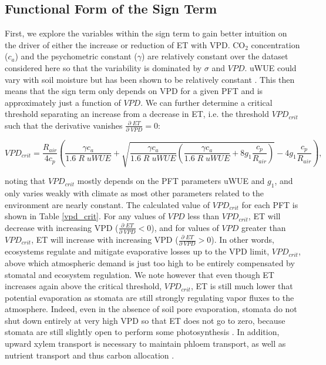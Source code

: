 \documentclass[draft,linenumbers]{agujournal}
\begin{document}
\subsection{Functional Form of the Sign Term}
\label{sign_term}
First, we explore the variables within the sign term to gain better intuition on the driver of either the increase or reduction of ET with VPD. CO$_2$ concentration ($c_a$) and the psychometric constant ($\gamma$) are relatively constant over the dataset considered here so that the variability is dominated by $\sigma$ and $VPD$. uWUE could vary with soil moisture but has been shown to be relatively constant \citep{Zhou_2015}. This then means that the sign term only depends on VPD for a given PFT and is approximately just a function of $VPD$. We can further determine a critical threshold separating an increase from a decrease in ET, i.e. the threshold $VPD_{crit}$ such that the derivative vanishes $\frac{\partial \; ET}{\partial \; VPD} = 0$:
\small
\begin{linenomath*}
  \begin{equation}
VPD_{crit} = \frac{R_{air}}{4 c_p} \left( \frac{\gamma c_a}{1.6\; R \;  uWUE} + \sqrt{\frac{\gamma c_a}{1.6\; R \;  uWUE}\left( \frac{\gamma c_a}{1.6\; R \;  uWUE} + 8 g_1 \frac{c_p}{R_{air}}\right)} - 4 g_1 \frac{c_p}{R_{air}} \right),
\label{vpd_min_et}
  \end{equation}
\end{linenomath*}
\normalsize
noting that $VPD_{crit}$ mostly depends on the PFT parameters uWUE and $g_1$, and only varies weakly with climate as most other parameters related to the environment are nearly constant. The calculated value of $VPD_{crit}$ for each PFT is shown in Table \ref{vpd_crit}. For any values of $VPD$ less than $VPD_{crit}$, ET will decrease with increasing VPD ($\frac{\partial \; ET}{\partial \; VPD} < 0$), and for values of $VPD$ greater than $VPD_{crit}$, ET will increase with increasing VPD ($\frac{\partial \; ET}{\partial \; VPD} > 0$). In other words, ecosystems regulate and mitigate evaporative losses up to the VPD limit, $VPD_{crit}$, above which atmospheric demand is just too high to be entirely compensated by stomatal and ecosystem regulation. We note however that even though ET increases again above the critical threshold, $VPD_{crit}$, ET is still much lower that potential evaporation as stomata are still strongly regulating vapor fluxes to the atmosphere. Indeed, even in the absence of soil pore evaporation, stomata do not shut down entirely at very high VPD so that ET does not go to zero, because stomata are still slightly open to perform some photosynthesis \citep{Ball_1987, Leuning_1990, MEDLYN_2011}. In addition, upward xylem transport is necessary to maintain phloem transport, as well as nutrient transport and thus carbon allocation \citep{De_2013, Nikinmaa_2013, Ryan_2014}.
\end{document}

